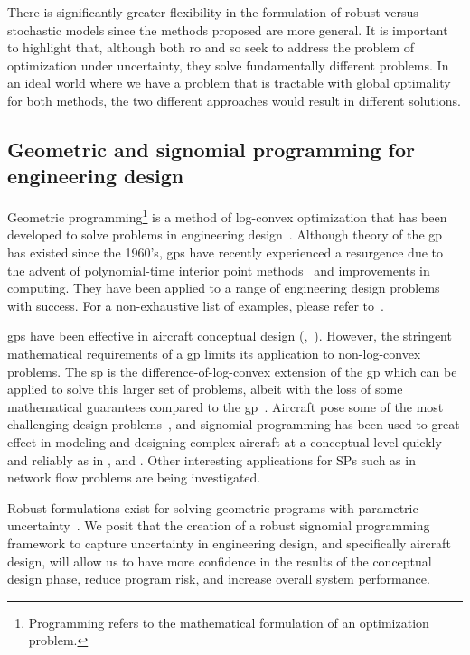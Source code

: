 There is significantly greater flexibility in the formulation of robust versus stochastic models
since the methods proposed are more general. It is important to highlight that,
although both \gls{ro} and \gls{so} seek to address the problem
of optimization under uncertainty, they solve fundamentally different problems. In an ideal world where
we have a problem that is tractable with global optimality for both methods, the two different
approaches would result in different solutions.

\subsection{Geometric and signomial programming for engineering design}

Geometric programming\footnote{Programming refers to the mathematical formulation of an optimization problem.}
is a method of log-convex optimization that has been developed
to solve problems in engineering design~\cite{Duffin1967}. Although theory of the \gls{gp} has existed since
the 1960's, \gls{gp}s have recently experienced a resurgence due to the advent of polynomial-time
interior point methods~\cite{Nesterov1994} and improvements in computing. They have been
applied to a range of engineering design problems with success. For a non-exhaustive list of examples,
please refer to~\cite{Boyd2007}.

\gls{gp}s have been effective in aircraft conceptual design
(\cite{Hoburg2013},~\cite{Burton2017}).
However, the stringent mathematical requirements of a \gls{gp} limits its application to non-log-convex problems.
The \gls{sp} is the difference-of-log-convex extension of the \gls{gp} which can be applied to
solve this larger set of problems, albeit with the loss of some mathematical guarantees compared to the \gls{gp}~\cite{Kirschen2018}.
Aircraft pose some of the most challenging design problems~\cite{York2018}, and signomial programming
has been used to great effect in modeling and designing complex aircraft at a conceptual level quickly
and reliably as in \cite{York2018}, \cite{Kirschen2016} and \cite{Kirschen2018}.
Other interesting applications for SPs such as in network flow problems are being investigated.

Robust formulations exist for solving geometric programs with parametric uncertainty~\cite{Saab2018}.
We posit that the creation of a robust signomial programming framework to capture uncertainty in engineering
design, and specifically aircraft design, will allow us to have more confidence in the results
of the conceptual design phase, reduce program risk, and increase overall system performance.

